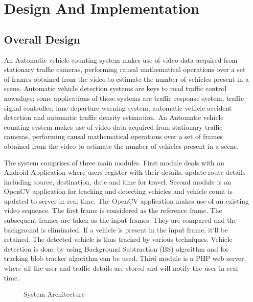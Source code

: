 \chapter{Design And Implementation}


\section{Overall Design}


An Automatic vehicle counting system makes use of video data acquired from stationary traffic cameras, performing causal mathematical operations over a set of frames obtained from the video to estimate the number of vehicles present in a scene. Automatic vehicle detection systems are keys to road traffic control nowadays; some applications of these systems are traffic response system, traffic signal controller, lane departure warning system, automatic vehicle accident detection and automatic traffic density estimation. An Automatic vehicle counting system makes use of video data acquired from stationary traffic cameras, performing causal mathematical operations over a set of frames obtained from the video to estimate the number of vehicles present in a scene. 

The system comprises of three main modules. First module deals with an Android Application where users register with their details, update route details including source, destination, date and time for travel. Second module is an OpenCV application for tracking and detecting vehicles and vehicle count is updated to server in real time. The OpenCV application makes use of an existing video sequence. The first frame is considered as the reference frame. The subsequent frames are taken as the input frames. They are compared and the background is eliminated. If a vehicle is present in the input frame, it’ll be retained. The detected vehicle is thus tracked by various techniques. Vehicle detection is done by using Background Subtraction (BS) algorithm and for tracking blob tracker algorithm can be used. Third module is a PHP web server, where all the user and traffic details are stored and will notify the user in real time.  


\begin{figure}[ht] 
{\par}
\caption{System Architecture}
\end{figure}\\

\\

